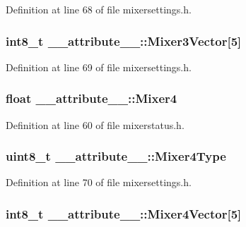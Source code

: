 \-Definition at line 68 of file mixersettings.\-h.

\hypertarget{struct____attribute_____ae5b52b10cc7eac03d87d66b30e4eed28}{
\subsubsection[{\-Mixer3\-Vector}]{\setlength{\rightskip}{0pt plus 5cm}int8\-\_\-t {\bf \-\_\-\-\_\-attribute\-\_\-\-\_\-\-::\-Mixer3\-Vector}\mbox{[}5\mbox{]}}}\label{struct____attribute_____ae5b52b10cc7eac03d87d66b30e4eed28}


\-Definition at line 69 of file mixersettings.\-h.

\hypertarget{struct____attribute_____a7ee10b5fc6b488f89f199043797381bb}{
\subsubsection[{\-Mixer4}]{\setlength{\rightskip}{0pt plus 5cm}float {\bf \-\_\-\-\_\-attribute\-\_\-\-\_\-\-::\-Mixer4}}}\label{struct____attribute_____a7ee10b5fc6b488f89f199043797381bb}


\-Definition at line 60 of file mixerstatus.\-h.

\hypertarget{struct____attribute_____a8361e3ee32a2e8bf03551db63c9b548a}{
\subsubsection[{\-Mixer4\-Type}]{\setlength{\rightskip}{0pt plus 5cm}uint8\-\_\-t {\bf \-\_\-\-\_\-attribute\-\_\-\-\_\-\-::\-Mixer4\-Type}}}\label{struct____attribute_____a8361e3ee32a2e8bf03551db63c9b548a}


\-Definition at line 70 of file mixersettings.\-h.

\hypertarget{struct____attribute_____a7c34f29b09865a42e02c21177bf98b3f}{
\subsubsection[{\-Mixer4\-Vector}]{\setlength{\rightskip}{0pt plus 5cm}int8\-\_\-t {\bf \-\_\-\-\_\-attribute\-\_\-\-\_\-\-::\-Mixer4\-Vector}\mbox{[}5\mbox{]}}}\label{struct____attribute_____a7c34f29b09865a42e02c21177bf98b3f}


